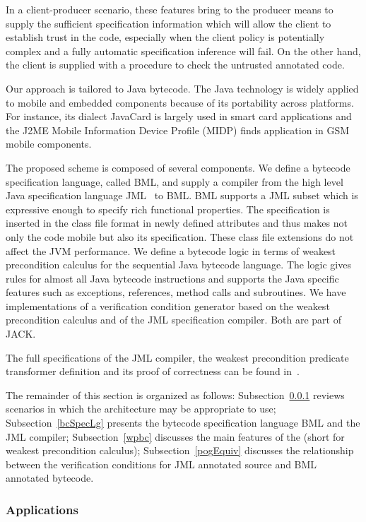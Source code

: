 In a client-producer scenario, these features bring to the producer means to supply the sufficient specification information 
which will allow the client to establish trust in the code, especially when the client policy is potentially complex and a fully automatic specification inference
will fail. On the other hand, the client is supplied with a procedure to check the untrusted annotated code. 

Our approach is tailored to Java bytecode.
The Java technology is widely applied to mobile and embedded components because of its portability across platforms. 
For instance, its dialect JavaCard is largely used in smart card applications and the J2ME Mobile Information Device Profile 
(MIDP) finds application in GSM mobile components. 


The proposed scheme is composed of several components.
 We define a bytecode specification language, called BML, and supply a compiler from 
 the high level Java specification language JML~\cite{JMLRefMan} to BML. 
 BML supports a JML subset which is expressive enough to specify rich functional properties. 
The specification is inserted in the class file format in newly defined attributes and thus makes not
 only the code mobile but also its specification. These class
 file extensions do not affect the JVM performance.
We define a bytecode logic in terms of weakest precondition calculus for the sequential Java bytecode language. 
The logic gives rules for almost all Java bytecode instructions and supports the Java specific features such as
exceptions, references, method calls and subroutines.  
 We have implementations of a verification condition generator based on the weakest precondition calculus and of
 the JML specification compiler. Both are part of JACK.

  The full specifications of the JML compiler, the weakest precondition predicate transformer definition and its proof of correctness can be found in~\cite{JBL05MP}.
  
The remainder of this section is organized as follows: 
Subsection~\ref{architecture_s} reviews scenarios in which the architecture may be appropriate to use; 
 Subsection~\ref{bcSpecLg} presents the bytecode specification language BML and the JML compiler; Subsection~\ref{wpbc} discusses the main
features of the \wpi (short for weakest precondition calculus); Subsection~\ref{pogEquiv} discusses the relationship between the verification conditions for JML annotated source and BML annotated bytecode.


\subsubsection{Applications}
\label{architecture_s}  


